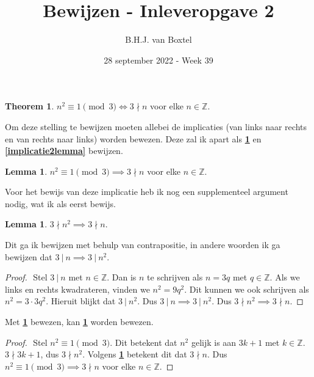 \documentclass[12pt, dutch, a4paper]{article}
\theoremstyle{definition}
\newtheorem{theorem}{Theorem}
\newtheorem{lemma}{Lemma}[theorem]
\newtheorem{sublemma}{Lemma}[lemma]
\begin{document}
\title{Bewijzen - Inleveropgave 2}
\author{B.H.J. van Boxtel}
\date{28 september 2022 - Week 39} 

\maketitle
{} %

\begin{theorem} \label{maintheorem}
    $n^2 \equiv 1 \pmod{3} \iff 3 \nmid n$ voor elke $n \in \mathbb{Z}$. 
\end{theorem}   

Om deze stelling te bewijzen moeten allebei de implicaties 
(van links naar rechts en van rechts naar links) worden bewezen. Deze zal ik apart
als \textbf{\cref{implicatie1lemma}} en \textbf{\cref{implicatie2lemma}} bewijzen.

\begin{lemma} \label{implicatie1lemma}
    $n^2 \equiv 1 \pmod{3} \implies 3 \nmid n$ voor elke $n \in \mathbb{Z}$. 
\end{lemma}
Voor het bewijs van deze implicatie heb ik nog een supplementeel argument nodig, 
wat ik als eerst bewijs. 

\begin{sublemma} \label{sublemma1}
    $3 \nmid n^2 \implies 3 \nmid n$.
\end{sublemma}

Dit ga ik bewijzen met behulp van contrapositie, in andere woorden ik ga bewijzen dat
$3 \: | \: n \implies 3 \: | \: n^2$.
\begin{proof} $ $\newline
    Stel $3 \: | \: n$ met $n \in \mathbb{Z}$. \newline
    Dan is $n$ te schrijven als $n = 3q$ met $q \in \mathbb{Z}$. \newline
    Als we links en rechts kwadrateren, 
    vinden we $n^2 = 9q^2$. \newline
    Dit kunnen we ook schrijven als $n^2 = 3 \cdot 3q^2$. \newline
    Hieruit blijkt dat $3 \: | \: n^2$. \newline 
    Dus $3 \: | \: n \implies 3 \: | \: n^2$. \newline
    Dus $3 \nmid n^2 \implies 3 \nmid n$.
\end{proof}

Met \textbf{\cref{sublemma1}} bewezen, 
kan \textbf{\cref{implicatie1lemma}} worden bewezen.
\begin{proof} $ $\newline
    Stel $n^2 \equiv 1 \pmod{3}$. \newline
    Dit betekent dat $n^2$ gelijk is aan $3k+1$ met $k \in \mathbb{Z}$. \newline
    $3 \nmid 3k + 1$, dus $3 \nmid n^2$. \newline
    Volgens \textbf{\cref{implicatie1lemma}} betekent dit dat $3 \nmid n$. \newline
    Dus $n^2 \equiv 1 \pmod{3} \implies 3 \nmid n$ voor elke $n \in \mathbb{Z}$.
\end{proof}
\end{document}
